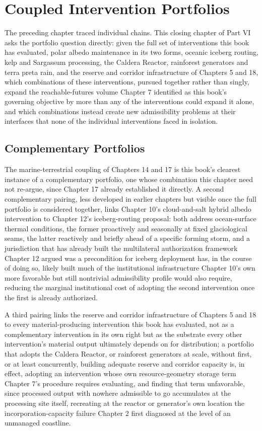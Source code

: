 \documentclass[11pt,oneside]{book}
\begin{document}
\chapter{Coupled Intervention Portfolios}

The preceding chapter traced individual chains. This closing chapter of Part VI asks the portfolio question directly: given the full set of interventions this book has evaluated, polar albedo maintenance in its two forms, oceanic iceberg routing, kelp and Sargassum processing, the Caldera Reactor, rainforest generators and terra preta rain, and the reserve and corridor infrastructure of Chapters 5 and 18, which combinations of these interventions, pursued together rather than singly, expand the reachable-futures volume Chapter 7 identified as this book's governing objective by more than any of the interventions could expand it alone, and which combinations instead create new admissibility problems at their interfaces that none of the individual interventions faced in isolation.

\section*{Complementary Portfolios}

The marine-terrestrial coupling of Chapters 14 and 17 is this book's clearest instance of a complementary portfolio, one whose combination this chapter need not re-argue, since Chapter 17 already established it directly. A second complementary pairing, less developed in earlier chapters but visible once the full portfolio is considered together, links Chapter 10's cloud-and-salt hybrid albedo intervention to Chapter 12's iceberg-routing proposal: both address ocean-surface thermal conditions, the former proactively and seasonally at fixed glaciological seams, the latter reactively and briefly ahead of a specific forming storm, and a jurisdiction that has already built the multilateral authorization framework Chapter 12 argued was a precondition for iceberg deployment has, in the course of doing so, likely built much of the institutional infrastructure Chapter 10's own more favorable but still nontrivial admissibility profile would also require, reducing the marginal institutional cost of adopting the second intervention once the first is already authorized.

A third pairing links the reserve and corridor infrastructure of Chapters 5 and 18 to every material-producing intervention this book has evaluated, not as a complementary intervention in its own right but as the substrate every other intervention's material output ultimately depends on for distribution; a portfolio that adopts the Caldera Reactor, or rainforest generators at scale, without first, or at least concurrently, building adequate reserve and corridor capacity is, in effect, adopting an intervention whose own resource-geometry storage term Chapter 7's procedure requires evaluating, and finding that term unfavorable, since processed output with nowhere admissible to go accumulates at the processing site itself, recreating at the reactor or generator's own location the incorporation-capacity failure Chapter 2 first diagnosed at the level of an unmanaged coastline.
\end{document}
